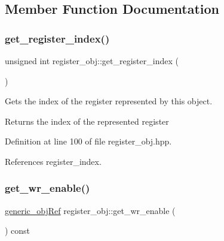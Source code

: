 \subsection{Member Function Documentation}
\mbox{\label{classregister__obj_a772ea871c6bae46353122dcf6238edd8}} 
\subsubsection{\texorpdfstring{get\+\_\+register\+\_\+index()}{get\_register\_index()}}
{\footnotesize\ttfamily unsigned int register\+\_\+obj\+::get\+\_\+register\+\_\+index (\begin{DoxyParamCaption}{ }\end{DoxyParamCaption})\hspace{0.3cm}{\ttfamily [inline]}}



Gets the index of the register represented by this object. 

\begin{DoxyReturn}{Returns}
the index of the represented register 
\end{DoxyReturn}


Definition at line 100 of file register\+\_\+obj.\+hpp.



References register\+\_\+index.

\mbox{\label{classregister__obj_a9c059a18b70d315a984f9f541c52336b}} 
\subsubsection{\texorpdfstring{get\+\_\+wr\+\_\+enable()}{get\_wr\_enable()}}
{\footnotesize\ttfamily \hyperlink{generic__obj_8hpp_acb533b2ef8e0fe72e09a04d20904ca81}{generic\+\_\+obj\+Ref} register\+\_\+obj\+::get\+\_\+wr\+\_\+enable (\begin{DoxyParamCaption}{ }\end{DoxyParamCaption}) const\hspace{0.3cm}{\ttfamily [inline]}}



